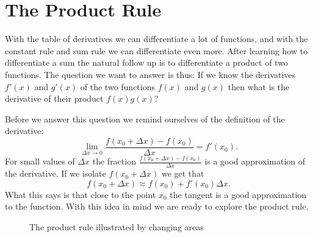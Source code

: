 \documentclass[main.tex]{subfiles}
\begin{document}
\section{The Product Rule}
With the table of derivatives we can differentiate a lot of functions, and with the constant rule and sum rule we can differentiate even more. After learning how to differentiate a sum the natural follow up is to differentiate a product of two functions. The question we want to answer is thus: If we know the derivatives $f'(x)$ and $g'(x)$ of the two functions $f(x)$ and $g(x)$ then what is the derivative of their product $f(x) g(x)$?

Before we answer this question we remind ourselves of the definition of the derivative:
\begin{equation}
\lim_{\Delta x \to 0} \frac{f(x_0 + \Delta x) - f(x_0)}{\Delta x} = f'(x_0).
\end{equation}
For small values of $\Delta x$ the fraction $\frac{f(x_0 + \Delta x) - f(x_0)}{\Delta x}$ is a good approximation of the derivative. If we isolate $f(x_0 + \Delta x)$ we get that
\begin{equation}
f(x_0 + \Delta x) \approx f(x_0) + f'(x_0) \Delta x.
\end{equation}
What this says is that close to the point $x_0$ the tangent is a good approximation to the function. With this idea in mind we are ready to explore the product rule.

\begin{figure}
\begin{center}
\caption{The product rule illustrated by changing areas} \label{fig:prodRule}
\end{center}
\end{figure}
\end{document}
